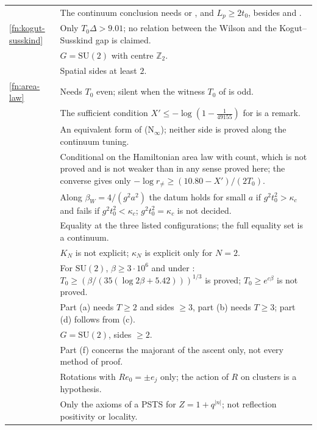 \documentclass[11pt,a4paper]{amsart}
\theoremstyle{definition}
\theoremstyle{remark}
\numberwithin{equation}{section}
\newcommand{\Z}{\mathbb{Z}}          %
\newcommand{\abs}[1]{\lvert #1\rvert}      %
\newcommand{\SU}{\mathrm{SU}}              %
\newcommand{\PSTS}{\textup{PSTS}}          %
\newcommand{\Mcirc}{\text{\upshape(M$^{\circ}$)}}   %
\newcommand{\Bstar}{\text{\upshape(B$^{*}$)}}       %
\newcommand{\hypP}{\text{\upshape(P)}}              %
\newcommand{\hypW}{\text{\upshape(W)}}              %
\newcommand{\UVB}{\text{\upshape(UVB)}}             %
\newcommand{\Kone}{\text{\upshape(K1)}}             %
\newcommand{\Ktwo}{\text{\upshape(K2)}}             %
\newcommand{\tzero}{t_0}                   %
\newcommand{\Tzero}{T_0}                   %
\newcommand{\Lp}{L_p}                      %
\newcommand{\betaW}{\beta_{W}}             %
\begin{document}
{\begin{longtable}{@{}p{}p{}@{}}
{thm:casimir-criterion} & The continuum conclusion needs \UVB{} or \hypW{}, and $\Lp\ge2\tzero$, besides \Kone{} and \Ktwo{}.\\
\cref{fn:kogut-susskind} & Only $\Tzero\Delta>9.01$; no relation between the Wilson and the Kogut--Susskind gap is claimed.\\
{prop:window-split} & $G=\SU(2)$ with centre $\Z_2$.\\
{prop:no-residue-control} & Spatial sides at least $2$.\\
\cref{fn:area-law} & Needs $\Tzero$ even; silent when the witness $\Tzero$ of \Mcirc{} is odd.\\
{thm:magnetic-P} & The sufficient condition $X'\le-\log(1-\frac1{49155})$ for \hypP{} is a remark.\\
{cor:neutral-linear} & An equivalent form of \textup{(N$_\infty$)}; neither side is proved along the continuum tuning.\\
{thm:flux-count} & Conditional on the Hamiltonian area law with count, which is not proved and is not weaker than \Mcirc{} in any sense proved here; the converse gives only $-\log r_{\ne}\ge(10.80-X')/(2\Tzero)$.\\
{thm:two-dim} & Along $\betaW=4/(g^2a^2)$ the datum holds for small $a$ if $g^2\tzero^2>\kappa_c$ and fails if $g^2\tzero^2<\kappa_c$; $g^2\tzero^2=\kappa_c$ is not decided.\\
{lem:lemma-W} & Equality at the three listed configurations; the full equality set is a continuum.\\
{thm:SUN-gap} & $K_N$ is not explicit; $\kappa_N$ is explicit only for $N=2$.\\
{cor:base-scale} & For $\SU(2)$, $\beta\ge3\cdot10^6$ and under \Bstar{}: $\Tzero\ge(\beta/(35(\log2\beta+5.42)))^{1/3}$ is proved; $\Tzero\ge e^{c\beta}$ is not proved.\\
{thm:fixed-window} & Part (a) needs $T\ge2$ and sides $\ge3$, part (b) needs $T\ge3$; part (d) follows from (c).\\
{prop:flux-saturation} & $G=\SU(2)$, sides $\ge2$.\\
{thm:free-gluon} & Part (f) concerns the majorant of the ascent only, not every method of proof.\\
{thm:rotation-triviality} & Rotations with $Re_0=\pm e_j$ only; the action of $R$ on clusters is a hypothesis.\\
{prop:gapless-sector} & Only the axioms of a \PSTS{} for $Z=1+q^{\abs n}$; not reflection positivity or locality.\\

\end{longtable}}
\end{document}
